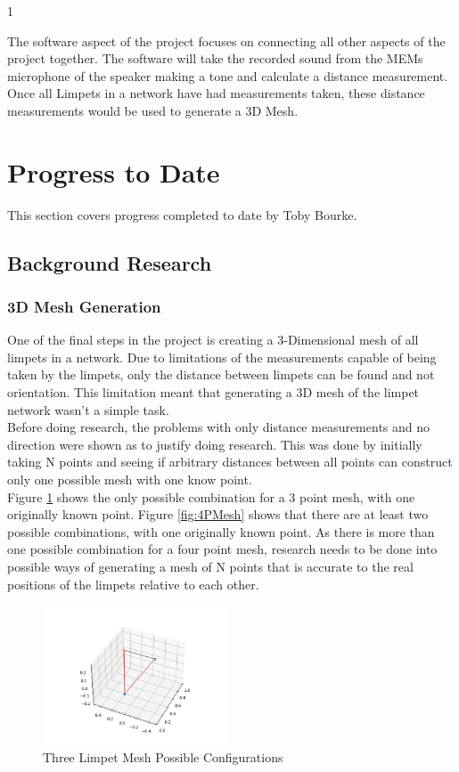 1\documentclass{article}
\begin{document}
The software aspect of the project focuses on connecting all other aspects of the project together. The software will take the recorded sound from the MEMs microphone of the speaker making a tone and calculate a distance measurement. Once all Limpets in a network have had measurements taken, these distance measurements would be used to generate a 3D Mesh.

\pagebreak
\section{Progress to Date}
This section covers progress completed to date by Toby Bourke.
\subsection{Background Research}
\subsubsection{3D Mesh Generation}
One of the final steps in the project is creating a 3-Dimensional mesh of all limpets in a network. Due to limitations of the measurements capable of being taken by the limpets, only the distance between limpets can be found and not orientation. This limitation meant that generating a 3D mesh of the limpet network wasn't a simple task.\\

Before doing research, the problems with only distance measurements and no direction were shown as to justify doing research. This was done by initially taking N points and seeing if arbitrary distances between all points can construct only one possible mesh with one know point.\\

Figure \ref{fig:3PMesh} shows the only possible combination for a 3 point mesh, with one originally known point. Figure \ref{fig:4PMesh} shows that there are at least two possible combinations, with one originally known point. As there is more than one possible combination for a four point mesh, research needs to be done into possible ways of generating a mesh of N points that is accurate to the real positions of the limpets relative to each other.\\

\begin{figure}[H]
	\centering
	\noindent\includegraphics[width=0.49\textwidth]{images/3LimpetNet}
	\caption{Three Limpet Mesh Possible Configurations}
	\label{fig:3PMesh}
\end{figure}
\end{document}
